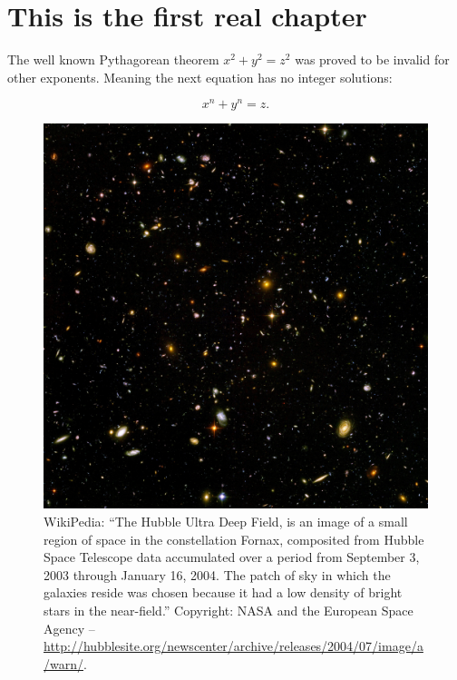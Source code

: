 \chapter{This is the first real chapter}


\lipsum[1]


The well known Pythagorean theorem \(x^2 + y^2 = z^2\) was 
proved to be invalid for other exponents. 
Meaning the next equation has no integer solutions:

\begin{equation}
	x^n + y^n = z
	.
\end{equation}

\lipsum[2]

\begin{figure}[h]
\includegraphics[width=\textwidth]{./chapters/chapter1/figures/Hubble_ultra_deep_field.jpg}
\caption{WikiPedia: ``The Hubble Ultra Deep Field, is an image of a small region of space in the constellation Fornax, composited from Hubble Space Telescope data accumulated over a period from September 3, 2003 through January 16, 2004. The patch of sky in which the galaxies reside was chosen because it had a low density of bright stars in the near-field.'' Copyright: NASA and the European Space Agency -- \url{http://hubblesite.org/newscenter/archive/releases/2004/07/image/a/warn/}.}
\end{figure}

